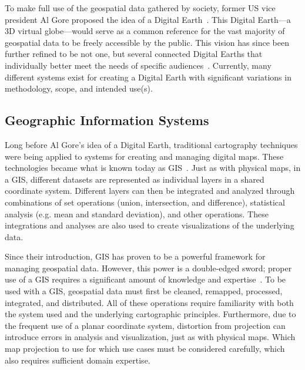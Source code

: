To make full use of the geospatial data gathered by society, former US vice president Al Gore proposed the idea of a Digital Earth~\cite{gore1998}.
This Digital Earth---a 3D virtual globe---would serve as a common reference for the vast majority of geospatial data to be freely accessible by the public.
This vision has since been further refined to be not one, but several connected Digital Earths that individually better meet the needs of specific audiences~\cite{goodchild2012next}.
Currently, many different systems exist for creating a Digital Earth with significant variations in methodology, scope, and intended use(s).


\subsection{Geographic Information Systems} \label{chap:2:GIS}
Long before Al Gore's idea of a Digital Earth, traditional cartography techniques were being applied to systems for creating and managing digital maps.
These technologies became what is known today as GIS~\cite{foresman1998history}.
Just as with physical maps, in a GIS, different datasets are represented as individual layers in a shared coordinate system.
Different layers can then be integrated and analyzed through combinations of set operations (union, intersection, and difference), statistical analysis (e.g. mean and standard deviation), and other operations.
These integrations and analyses are also used to create visualizations of the underlying data.


Since their introduction, GIS has proven to be a powerful framework for managing geospatial data.
However, this power is a double-edged sword; proper use of a GIS requires a significant amount of knowledge and expertise~\cite{antenucci1991geographic}.
To be used with a GIS, geospatial data must first be cleaned, remapped, processed, integrated, and distributed.
All of these operations require familiarity with both the system used and the underlying cartographic principles.
Furthermore, due to the frequent use of a planar coordinate system, distortion from projection can introduce errors in analysis and visualization, just as with physical maps.
Which map projection to use for which use cases must be considered carefully, which also requires sufficient domain expertise.


